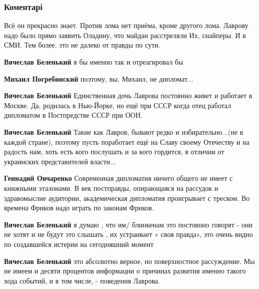  
 
 
 
 
\subsubsection{Коментарі}
\label{sec:05_12_2021.fb.pogrebinskij_mihail.1.vranje_blinkena.cmt}

\begin{itemize} %
Всё он прекрасно знает.
Против лома нет приёма, кроме другого лома.
Лаврову надо было прямо заявить Оладину, что майдан расстреляли Их, снайперы.
И в СМИ.
Тем более, это не далеко от правды по сути.

\begin{itemize} %
\textbf{Вячеслав Беленький} я бы именно так и отреагировал бы

\textbf{Михаил Погребинский} поэтому, вы, Михаил, не дипломат...

\textbf{Вячеслав Беленький} Единственная дочь Лаврова постоянно живет и работает в Москве. Да, родилась в Нью-Йорке, но ещё при СССР когда отец работал дипломатом в Постпредстве СССР при ООН.

\textbf{Вячеслав Беленький} Такие как Лавров, бывают редко и избирательно...(не в каждой стране), поэтому пусть поработает ещё на Славу своему Отечеству и на радость нам, хоть есть кого послушать и за кого гордится, в отличии от украинских представителей власти...

\textbf{Геннадий Овчаренко} Современная дипломатия ничего общего не имеет с книжными эталонами.
В век постправды, опирающаяся на рассудок и здравомыслие аудитории, академическая дипломатия проигрывает с треском.
Во времена Фриков надо играть по законам Фриков.

\textbf{Вячеслав Беленький} я думаю , что им/ блинкенам это постоянно говорят - они не хотят и не будут это слышать , их устраивает « своя правда», это очень видно по создавшейся истерии на сегодняшний момент

\textbf{Вячеслав Беленький} это абсолютно верное, но поверхностное рассуждение.
Мы не имеем и десяти процентов информации о причинах развития именно такого хода событий, и в том числе, - поведения Лаврова.


\end{itemize}
\end{itemize}
